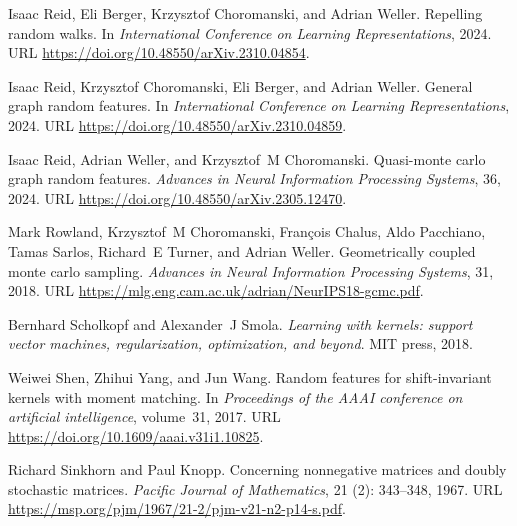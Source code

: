 \begin{thebibliography}{76}
Isaac Reid, Eli Berger, Krzysztof Choromanski, and Adrian Weller.
\newblock Repelling random walks.
\newblock In \emph{International Conference on Learning Representations}, 2024{}.
\newblock URL \url{https://doi.org/10.48550/arXiv.2310.04854}.

Isaac Reid, Krzysztof Choromanski, Eli Berger, and Adrian Weller.
\newblock General graph random features.
\newblock In \emph{International Conference on Learning Representations}, 2024{}.
\newblock URL \url{https://doi.org/10.48550/arXiv.2310.04859}.

Isaac Reid, Adrian Weller, and Krzysztof~M Choromanski.
\newblock Quasi-monte carlo graph random features.
\newblock \emph{Advances in Neural Information Processing Systems}, 36, 2024{}.
\newblock URL \url{https://doi.org/10.48550/arXiv.2305.12470}.

Mark Rowland, Krzysztof~M Choromanski, Fran{\c{c}}ois Chalus, Aldo Pacchiano, Tamas Sarlos, Richard~E Turner, and Adrian Weller.
\newblock Geometrically coupled monte carlo sampling.
\newblock \emph{Advances in Neural Information Processing Systems}, 31, 2018.
\newblock URL \url{https://mlg.eng.cam.ac.uk/adrian/NeurIPS18-gcmc.pdf}.

Bernhard Scholkopf and Alexander~J Smola.
\newblock \emph{Learning with kernels: support vector machines, regularization, optimization, and beyond}.
\newblock MIT press, 2018.

Weiwei Shen, Zhihui Yang, and Jun Wang.
\newblock Random features for shift-invariant kernels with moment matching.
\newblock In \emph{Proceedings of the AAAI conference on artificial intelligence}, volume~31, 2017.
\newblock URL \url{https://doi.org/10.1609/aaai.v31i1.10825}.

Richard Sinkhorn and Paul Knopp.
\newblock Concerning nonnegative matrices and doubly stochastic matrices.
\newblock \emph{Pacific Journal of Mathematics}, 21 (2): 343--348, 1967.
\newblock URL \url{https://msp.org/pjm/1967/21-2/pjm-v21-n2-p14-s.pdf}.


\end{thebibliography}
